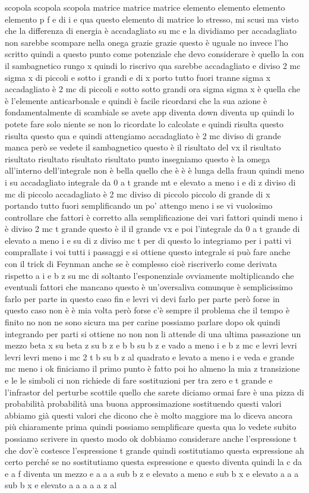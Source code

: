 \begin{soluzione}
   scopola scopola scopola matrice matrice matrice elemento elemento elemento elemento p f e di i e qua questo elemento di matrice lo stresso, mi scusi ma visto che la differenza di energia è accadagliato su mc e la dividiamo per accadagliato non sarebbe scompare nella onega grazie grazie questo è uguale no invece l'ho scritto quindi a questo punto come potenziale che devo considerare è quello la con il sambagnetico rungo x quindi lo riscrivo qua sarebbe accadagliato e diviso 2 mc sigma x di piccoli e sotto i grandi e di x porto tutto fuori tranne sigma x accadagliato è 2 mc di piccoli e sotto sotto grandi ora sigma sigma x è quella che è l'elemente anticarbonale e quindi è facile ricordarsi che la sua azione è fondamentalmente di scambiale se avete app diventa down diventa up quindi lo potete fare solo niente se non lo ricordate lo calcolate e quindi risulta questo risulta questo qua e quindi attengiamo accadagliato è 2 mc diviso di grande manca però se vedete il sambagnetico questo è il risultato del vx il risultato risultato risultato risultato risultato punto insegniamo questo è la omega all'interno dell'integrale non è bella quello che è è è lunga della fraun quindi meno i su accadagliato integrale da 0 a t grande mt e elevato a meno i e di z diviso di mc di piccolo accadagliato è 2 mc diviso di piccolo piccolo di grande di x portando tutto fuori semplificando un po' attengo meno i se vi vuolosimo controllare che fattori è corretto alla semplificazione dei vari fattori quindi meno i è diviso 2 mc t grande questo è il il grande vx e poi l'integrale da 0 a t grande di elevato a meno i e su di z diviso mc t per di questo lo integriamo per i patti vi comprallate i voi tutti i passaggi e si ottiene questo integrale si può fare anche con il trick di Feynman anche se è complesso cioè riscriverlo come derivata rispetto a i e b z su mc di soltanto l'esponenziale ovviamente moltiplicando che eventuali fattori che mancano questo è un'oversaliva comunque è semplicissimo farlo per parte in questo caso fin e levri vi devi farlo per parte però forse in questo caso non è è mia volta però forse c'è sempre il problema che il tempo è finito no non ne sono sicura ma per carine possiamo parlare dopo ok quindi integrando per parti si ottiene no non non li attende di una ultima passazione un mezzo beta x su beta z su b z e b b su b z e vado a meno i e b z mc e levri levri levri levri meno i mc 2 t b su b z al quadrato e levato a meno i e veda e grande mc meno i ok finiciamo il primo punto è fatto poi ho almeno la mia z transizione e le le simboli ci non richiede di fare sostituzioni per tra zero e t grande e l'infrastor del perturbe scottile quello che sarete diciamo ormai fare è una pizza di probabilità probabilità una buona approssimazione sostituendo questi valori abbiamo già questi valori che dicono che è molto maggiore ma lo diceva ancora più chiaramente prima quindi possiamo semplificare questa qua lo vedete subito possiamo scrivere in questo modo ok dobbiamo considerare anche l'espressione t che dov'è costesce l'espressione t grande quindi sostitutiamo questa espressione ah certo perché se no sostitutiamo questa espressione e questo diventa quindi la c da e a f diventa un mezzo e a a a sub b z e elevato a meno e sub b x e elevato a a a sub b x e elevato a a a a a z al 
\end{soluzione}

